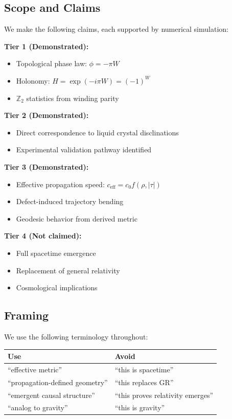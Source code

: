 \documentclass[11pt,a4paper]{article}
\begin{document}
\subsection{Scope and Claims}

We make the following claims, each supported by numerical simulation:

\textbf{Tier 1 (Demonstrated):}
\begin{itemize}
    \item Topological phase law: $\phi = -\pi W$
    \item Holonomy: $H = \exp(-i\pi W) = (-1)^W$
    \item $\mathbb{Z}_2$ statistics from winding parity
\end{itemize}

\textbf{Tier 2 (Demonstrated):}
\begin{itemize}
    \item Direct correspondence to liquid crystal disclinations
    \item Experimental validation pathway identified
\end{itemize}

\textbf{Tier 3 (Demonstrated):}
\begin{itemize}
    \item Effective propagation speed: $c_{\text{eff}} = c_0 f(\rho, |\tau|)$
    \item Defect-induced trajectory bending
    \item Geodesic behavior from derived metric
\end{itemize}

\textbf{Tier 4 (Not claimed):}
\begin{itemize}
    \item Full spacetime emergence
    \item Replacement of general relativity
    \item Cosmological implications
\end{itemize}

\subsection{Framing}

We use the following terminology throughout:

\begin{center}
\begin{tabular}{ll}
\toprule
\textbf{Use} & \textbf{Avoid} \\
\midrule
``effective metric'' & ``this is spacetime'' \\
``propagation-defined geometry'' & ``this replaces GR'' \\
``emergent causal structure'' & ``this proves relativity emerges'' \\
``analog to gravity'' & ``this is gravity'' \\
\bottomrule
\end{tabular}
\end{center}
\end{document}
